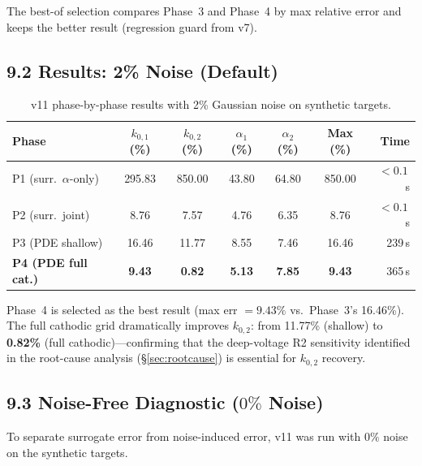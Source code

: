 \documentclass[11pt]{article}
\begin{document}
The best-of selection compares Phase~3 and Phase~4 by max relative error and
keeps the better result (regression guard from v7).

\subsection*{9.2 Results: 2\% Noise (Default)}

\begin{table}[H]
  \centering
  \caption{v11 phase-by-phase results with 2\% Gaussian noise on synthetic targets.}
  \label{tab:v11_noisy_ref}
  \begin{tabular}{l S[round-precision=2] S[round-precision=2]
                    S[round-precision=2] S[round-precision=2]
                    S[round-precision=2] r}
    \toprule
    Phase & {$k_{0,1}$ (\%)} & {$k_{0,2}$ (\%)}
          & {$\alpha_1$ (\%)} & {$\alpha_2$ (\%)}
          & {Max (\%)} & {Time} \\
    \midrule
    P1 (surr.\ $\alpha$-only)   & 295.83 & 850.00 & 43.80 & 64.80 & 850.00 & $<0.1$\,s \\
    P2 (surr.\ joint)           &   8.76 &   7.57 &  4.76 &  6.35 &   8.76 & $<0.1$\,s \\
    P3 (PDE shallow)            &  16.46 &  11.77 &  8.55 &  7.46 &  16.46 & 239\,s    \\
    \textbf{P4 (PDE full cat.)} &\textbf{9.43} & \textbf{0.82} & \textbf{5.13} & \textbf{7.85}
                                &\textbf{9.43} & 365\,s    \\
    \bottomrule
  \end{tabular}
\end{table}

Phase~4 is selected as the best result (max err $= 9.43\%$ vs.\ Phase~3's
16.46\%).  The full cathodic grid dramatically improves $k_{0,2}$: from 11.77\%
(shallow) to \textbf{0.82\%} (full cathodic)---confirming that the deep-voltage
R2 sensitivity identified in the root-cause analysis
(\S\ref{sec:rootcause}) is essential for $k_{0,2}$ recovery.

\subsection*{9.3 Noise-Free Diagnostic ($0\%$ Noise)}

To separate surrogate error from noise-induced error, v11 was run with
$0\%$ noise on the synthetic targets.
\end{document}
